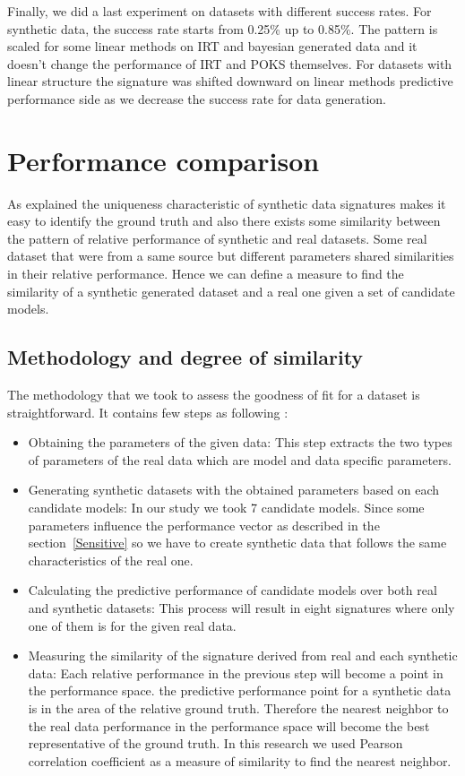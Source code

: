 Finally, we did a last experiment on datasets with different success rates. For synthetic data, the success rate starts from 0.25\% up to 0.85\%. The pattern is scaled for some linear methods on IRT and bayesian generated data and it doesn't change the performance of IRT and POKS themselves. For datasets with linear structure the signature was shifted downward on linear methods predictive performance side as we decrease the success rate for data generation.





\section{Performance comparison}
 
As explained the uniqueness characteristic of synthetic data signatures makes it easy to identify the ground truth and also there exists some similarity between the pattern of relative performance of synthetic and real datasets. Some real dataset that were from a same source but different parameters shared similarities in their relative performance. Hence we can define a measure to find the similarity of a synthetic generated dataset and a real one given a set of candidate models.

\subsection{Methodology and degree of similarity}
The methodology that we took to assess the goodness of fit for a dataset is straightforward. It contains few steps as following :
\begin{itemize}
\item Obtaining the parameters of the given data: This step extracts the two types of parameters of the real data which are model and data specific parameters. 
\item Generating synthetic datasets with the obtained parameters based on each candidate models: In our study we took 7 candidate models. Since some parameters influence the performance vector as described in the section~\ref{Sensitive} so we have to create synthetic data that follows the same characteristics of the real one.

\item Calculating the predictive performance of candidate models over both real and synthetic datasets: This process will result in eight signatures where only one of them is for the given real data.
\item Measuring the similarity of the signature derived from real and each synthetic data: Each relative performance in the previous step will become a point in the performance space. the predictive performance point for a synthetic data is in the area of the relative ground truth. Therefore the nearest neighbor to the real data performance in the performance space will become the best representative of the ground truth. In this research we used Pearson correlation coefficient as a measure of similarity to find the nearest neighbor.
\end{itemize}

